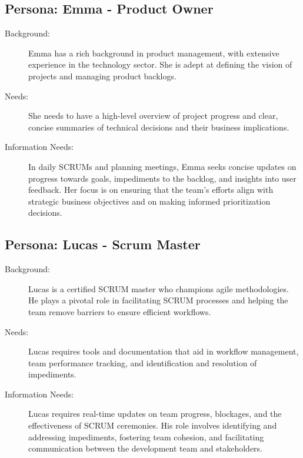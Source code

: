 \subsection*{Persona: Emma - Product Owner}
\begin{description}
    \item[Background:] Emma has a rich background in product management, with extensive experience in the technology sector. She is adept at defining the vision of projects and managing product backlogs.
    \item[Needs:] She needs to have a high-level overview of project progress and clear, concise summaries of technical decisions and their business implications.
    \item[Information Needs:] In daily SCRUMs and planning meetings, Emma seeks concise updates on progress towards goals, impediments to the backlog, and insights into user feedback. Her focus is on ensuring that the team's efforts align with strategic business objectives and on making informed prioritization decisions.
\end{description}

\subsection*{Persona: Lucas - Scrum Master}
\begin{description}
    \item[Background:] Lucas is a certified SCRUM master who champions agile methodologies. He plays a pivotal role in facilitating SCRUM processes and helping the team remove barriers to ensure efficient workflows.
    \item[Needs:] Lucas requires tools and documentation that aid in workflow management, team performance tracking, and identification and resolution of impediments.
    \item[Information Needs:] Lucas requires real-time updates on team progress, blockages, and the effectiveness of SCRUM ceremonies. His role involves identifying and addressing impediments, fostering team cohesion, and facilitating communication between the development team and stakeholders.

\end{description}

